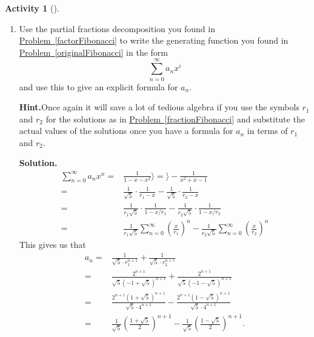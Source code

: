 \documentclass[10pt,]{book}
\theoremstyle{plain}
\theoremstyle{definition}
\newtheorem{activity}[project]{Activity}
\numberwithin{equation}{chapter}
\newcommand{\amp}{&}
\begin{document}
\begin{activity}[]\label{activity-209}
~\par
\begin{enumerate}[label=(\alph*)]
 \item Use the partial fractions decomposition you found in \hyperref[factorFibonacci]{Problem~\ref{factorFibonacci}} to write the generating function you found in \hyperref[originalFibonacci]{Problem~\ref{originalFibonacci}} in the form%
\begin{equation*}
\sum_{n=0}^\infty a_nx^i
\end{equation*}
and use this to give an explicit formula for \(a_n\).%
\par\medskip\noindent%
\textbf{Hint.}\quad Once again it will save a lot of tedious algebra if you use the symbols \(r_1\) and \(r_2\) for the solutions as in \hyperref[fractionFibonacci]{Problem~\ref{fractionFibonacci}} and substitute the actual values of the solutions once you have a formula for \(a_n\) in terms of \(r_1\) and \(r_2\).%
\par\medskip\noindent%
\textbf{Solution.}\quad %
\begin{align*}
\sum_{n=0}^\infty a_nx^n  =\amp \frac{1}{1-x-x^2}\rangle =\rangle -\frac{1}{x^2+x-1}\\
=\amp \frac{1}{\sqrt{5}}\cdot\frac{1}{r_1-x} -\frac{1}{\sqrt{5}}\cdot\frac{1}{r_2-x}\\
=\amp \frac{1}{r_1\sqrt{5}}\cdot\frac{1}{1-x/r_1} -\frac{1}{r_2\sqrt{5}}\cdot\frac{1}{1-x/r_2}\\
=\amp \frac{1}{r_1\sqrt{5}}\sum_{n=0}^\infty\left(\frac{x}{r_1}\right)^n
-\frac{1}{r_2\sqrt{5}}\sum_{n=0}^\infty  \left(\frac{x}{r_2}\right)^n
\end{align*}
This gives us that%
\begin{align*}
a_n =\amp \frac{1}{\sqrt{5}\cdot r_1^{n+1}}
+\frac{1}{\sqrt{5}\cdot r_2^{n+1}}\\
=\amp \frac{2^{n+1}}{\sqrt{5}(-1+\sqrt{5})^{n+1}}
+
\frac{2^{n+1}}{\sqrt{5}(-1-\sqrt{5})^{n+1}}\\
=\amp \frac{2^{n+1}(1+\sqrt{5})^{n+1}}{\sqrt{5}\cdot
4^{n+1}}-
\frac{2^{n+1}(1-\sqrt{5})^{n+1}}{\sqrt{5}\cdot4^{n+1}}\\
=\amp \frac{1}{\sqrt{5}}\left(\frac{1+\sqrt{5}}{2}\right)^{n+1}-
\frac{1}{\sqrt{5}}\left(\frac{1-\sqrt{5}}{2}\right)^{n+1}.
\end{align*}
%


\end{enumerate}
\end{activity}
\end{document}
